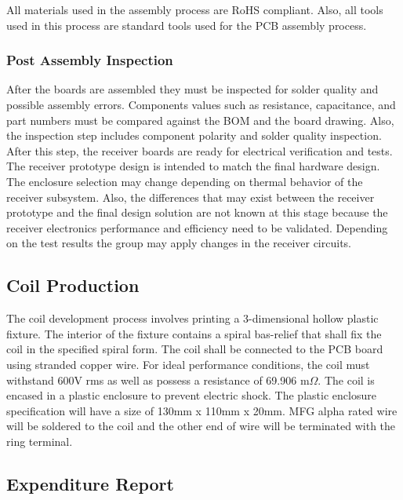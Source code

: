 \documentclass[12pt]{article}
\begin{document}
 \noindent
All materials used in the assembly process are  RoHS compliant. Also, all tools used in this process are standard tools used for the PCB assembly process.
 
 \subsubsection{Post Assembly Inspection}

\indent
After the boards are assembled they must be inspected for solder quality and possible assembly errors. Components values such as resistance, capacitance, and part numbers must be compared against the BOM and the board drawing. Also, the inspection step includes component polarity and solder quality inspection. After this step, the receiver boards are ready for electrical verification and tests.\\
 
 \indent
The receiver prototype design is intended to match the final hardware design. The enclosure selection may change depending on thermal behavior of the receiver subsystem. Also, the differences that may exist between the receiver prototype and the final design solution are not known at this stage because the receiver electronics performance and efficiency need to be validated. Depending on the test results the group may apply changes in the receiver circuits.
\hfill
\pagebreak

\subsection{Coil Production}

\indent \indent
The coil development process involves printing a 3-dimensional hollow plastic fixture. The interior of the fixture contains a spiral bas-relief that shall fix the coil in the specified spiral form. The coil shall be connected to the PCB board using stranded copper wire. For ideal performance conditions, the coil must withstand 600V rms as well as possess a resistance of 69.906 m$\Omega$. The coil is encased in a plastic enclosure to prevent electric shock. The plastic enclosure specification will have a size of 130mm x 110mm x 20mm. MFG alpha rated wire will be soldered to the coil and the other end of wire will be terminated with the ring terminal.  

\subsection{Expenditure Report}
\end{document}
